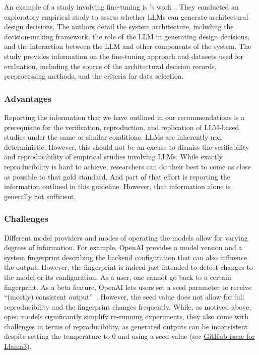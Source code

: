 An example of a study involving fine-tuning is \citeauthor{DBLP:conf/icsa/DharVV24}'s work~\cite{DBLP:conf/icsa/DharVV24}.
They conducted an exploratory empirical study to assess whether LLMs can generate architectural design decisions. The authors detail the system architecture, including the decision-making framework, the role of the LLM in generating design decisions, and the interaction between the LLM and other components of the system. The study provides information on the fine-tuning approach and datasets used for evaluation, including the source of the architectural decision records, preprocessing methods, and the criteria for data selection. 

\subsubsection{Advantages}

Reporting the information that we have outlined in our recommendations is a prerequisite for the verification, reproduction, and replication of LLM-based studies under the same or similar conditions.
LLMs are inherently non-deterministic. 
However, this should not be an excuse to dismiss the verifiability and reproducibility of empirical studies involving LLMs.
While exactly reproducibility is hard to achieve, researchers can do their best to come as close as possible to that gold standard.
And part of that effort is reporting the information outlined in this guideline. 
However, that information alone is generally not sufficient.

\subsubsection{Challenges}

Different model providers and modes of operating the models allow for varying degrees of information.
For example, OpenAI provides a model version and a system fingerprint describing the backend configuration that can also influence the output.
However, the fingerprint is indeed just intended to detect changes to the model or its configuration.
As a user, one cannot go back to a certain fingerprint.
As a beta feature, OpenAI lets users set a seed parameter to receive ``(mostly) consistent output''~\cite{OpenAI23}.
However, the seed value does not allow for full reproducibility and the fingerprint changes frequently. 
While, as motived above, open models significantly simplify re-running experiments, they also come with challenges in terms of reproducibility, as generated outputs can be inconsistent despite setting the temperature to 0 and using a seed value (see \href{https://github.com/ollama/ollama/issues/5321}{GitHub issue for Llama3}).

